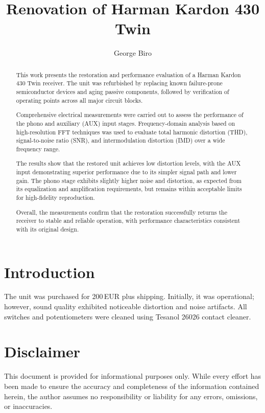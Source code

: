 \documentclass[]{article}
\title{Renovation of Harman Kardon 430 Twin}
\author{George Biro}
\begin{document}
\maketitle

\begin{abstract}
This work presents the restoration and performance evaluation of a Harman Kardon 430 Twin receiver. The unit was refurbished by replacing known failure-prone semiconductor devices and aging passive components, followed by verification of operating points across all major circuit blocks.

Comprehensive electrical measurements were carried out to assess the performance of the phono and auxiliary (AUX) input stages. Frequency-domain analysis based on high-resolution FFT techniques was used to evaluate total harmonic distortion (THD), signal-to-noise ratio (SNR), and intermodulation distortion (IMD) over a wide frequency range.

The results show that the restored unit achieves low distortion levels, with the AUX input demonstrating superior performance due to its simpler signal path and lower gain. The phono stage exhibits slightly higher noise and distortion, as expected from its equalization and amplification requirements, but remains within acceptable limits for high-fidelity reproduction.

Overall, the measurements confirm that the restoration successfully returns the receiver to stable and reliable operation, with performance characteristics consistent with its original design.

\end{abstract}

\section{Introduction}

The unit was purchased for 200\,EUR plus shipping.  
Initially, it was operational; however, sound quality exhibited noticeable distortion and noise artifacts.
All switches and potentiometers were cleaned using Tesanol 26026 contact cleaner.

\section{Disclaimer}

This document is provided for informational purposes only. While every effort has been made to ensure the accuracy and completeness of the information contained herein, the author assumes no responsibility or liability for any errors, omissions, or inaccuracies.
\end{document}
